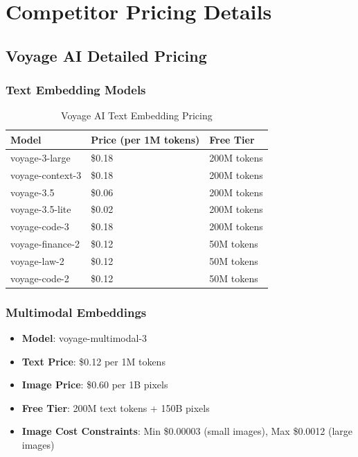 \section{Competitor Pricing Details}

\subsection{Voyage AI Detailed Pricing}

\subsubsection{Text Embedding Models}
\begin{table}[ht]
\centering
\begin{tabular}{|l|l|l|}
\hline
\textbf{Model} & \textbf{Price (per 1M tokens)} & \textbf{Free Tier} \\ \hline
voyage-3-large & \$0.18 & 200M tokens \\ \hline
voyage-context-3 & \$0.18 & 200M tokens \\ \hline
voyage-3.5 & \$0.06 & 200M tokens \\ \hline
voyage-3.5-lite & \$0.02 & 200M tokens \\ \hline
voyage-code-3 & \$0.18 & 200M tokens \\ \hline
voyage-finance-2 & \$0.12 & 50M tokens \\ \hline
voyage-law-2 & \$0.12 & 50M tokens \\ \hline
voyage-code-2 & \$0.12 & 50M tokens \\ \hline
\end{tabular}
\caption{Voyage AI Text Embedding Pricing}
\end{table}

\subsubsection{Multimodal Embeddings}
\begin{itemize}[noitemsep]
    \item \textbf{Model}: voyage-multimodal-3
    \item \textbf{Text Price}: \$0.12 per 1M tokens
    \item \textbf{Image Price}: \$0.60 per 1B pixels
    \item \textbf{Free Tier}: 200M text tokens + 150B pixels
    \item \textbf{Image Cost Constraints}: Min \$0.00003 (small images), Max \$0.0012 (large images)
\end{itemize}

